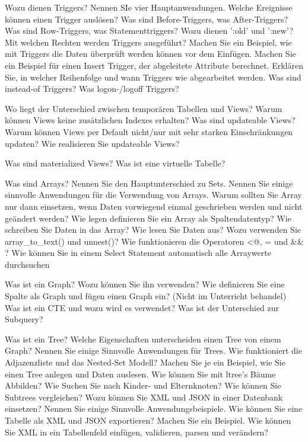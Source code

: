 \documentclass[ngerman,a4paper,12pt]{scrreprt}
\begin{document}
\olR
	\li Wozu dienen Triggers? Nennen SIe vier Hauptanwendungen.
	\li Welche Ereignisse können einen Trigger auslösen?
	\li Was sind Before-Triggers, was After-Triggers? Was sind Row-Triggers, was Statementtriggers?
	\li Wozu dienen ':old' und ':new'?
	\li Mit welchen Rechten werden Triggers ausgeführt?
	\li Machen Sie ein Beispiel, wie mit Triggers die Daten überprüft werden können vor dem Einfügen.
	\li Machen Sie ein Beispiel für einen Insert Trigger, der abgeleitete Attribute berechnet.
	\li Erklären Sie, in welcher Reihenfolge und wann Triggers wie abgearbeitet werden.
	\li Was sind instead-of Triggers? Was logon-/logoff Triggers?
\olS

\olR
	\li Wo liegt der Unterschied zwischen temporären Tabellen und Views?
	\li Warum können Views keine zusätzlichen Indexes erhalten?
	\li Was sind updateable Views? Warum können Views per Default nicht/nur mit sehr starken Einschränkungen updaten?
	\li Wie realisieren Sie updateable Views?
\olS

\olR
	\li Was sind materialized Views?
	\li Was ist eine virtuelle Tabelle?
\olS


\olR
	\li Was sind Arrays?
	\li Nennen Sie den Hauptunterschied zu Sets.
	\li Nennen Sie einige sinnvolle Anwendungen für die Verwendung von Arrays.
	\li Warum sollten Sie Array nur dann einsetzen, wenn Daten vorwiegend einmal geschrieben werden und nicht geändert werden?
	\li Wie legen definieren Sie ein Array als Spaltendatentyp? Wie schreiben Sie Daten in das Array? Wie lesen Sie Daten aus?
	\li Wozu verwenden Sie array\_to\_text() und unnest()?
	\li Wie funktionieren die Operatoren <@, = und \&\& ?
	\li Wie können Sie in einem Select Statement automatisch alle Arraywerte durchsuchen
\olS

\olR
	\li Was ist ein Graph? Wozu können Sie ihn verwenden?
	\li Wie definieren Sie eine Spalte als Graph und fügen einen Graph ein? (Nicht im Unterricht behandel)
	\li Was ist ein CTE und wozu wird es verwendet? Was ist der Unterschied zur Subquery?
\olS

\olR
	\li Was ist ein Tree? Welche Eigenschaften unterscheiden einen Tree von einem Graph?
	\li Nennen Sie einige Sinnvolle Anwendungen für Trees.
	\li Wie funktioniert die Adjazenzliste und das Nested-Set Modell? Machen Sie je ein Beispiel, wie Sie einen Tree anlegen und Daten auslesen.
	\li Wie können Sie mit ltree's Bäume Abbilden? Wie Suchen Sie nach Kinder- und Elternknoten? Wie können Sie Subtrees vergleichen?
	\li Wozu können Sie XML und JSON in einer Datenbank einsetzen? Nennen Sie einige Sinnvolle Anwendungsbeispiele.
	\li Wie können Sie eine Tabelle als XML und JSON exportieren? Machen Sie ein Beispiel.
	\li Wie können Sie XML in ein Tabellenfeld einfügen, validieren, parsen und verändern?
\olS
\end{document}

